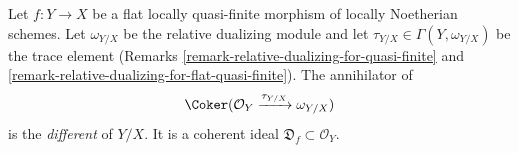 \begin{definition}
\label{definition-different}
Let $f : Y \to X$ be a flat locally quasi-finite morphism of
locally Noetherian schemes.
Let $\omega_{Y/X}$ be the relative dualizing module and let
$\tau_{Y/X} \in \Gamma(Y, \omega_{Y/X})$ be the trace element
(Remarks \ref{remark-relative-dualizing-for-quasi-finite} and
\ref{remark-relative-dualizing-for-flat-quasi-finite}).
The annihilator of
$$
\Coker(\mathcal{O}_Y \xrightarrow{\tau_{Y/X}} \omega_{Y/X})
$$
is the {\it different} of $Y/X$. It is a coherent ideal
$\mathfrak{D}_f \subset \mathcal{O}_Y$.
\end{definition}